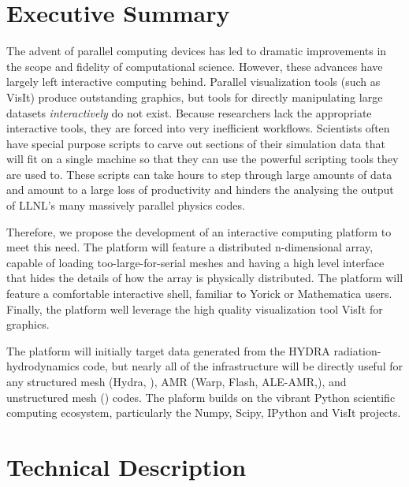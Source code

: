 \documentclass[a4paper]{article}
\begin{document}

\section*{Executive Summary }

The advent of parallel computing devices has led to dramatic improvements in the scope and fidelity of computational science.  However, these advances have largely left interactive computing behind.  Parallel visualization tools (such as VisIt) produce outstanding graphics, but tools for directly manipulating large datasets \emph{interactively} do not exist.  Because researchers lack the appropriate interactive tools, they are forced into very inefficient workflows.  Scientists often have special purpose scripts to carve out sections of their simulation data that will fit on a single machine so that they can use the powerful scripting tools they are used to.  These scripts can take hours to step through large amounts of data and amount to a large loss of productivity and hinders the analysing the output of LLNL's many massively parallel physics codes.

Therefore, we propose the development of an interactive computing platform to meet this need.  The platform will feature a distributed n-dimensional array, capable of loading too-large-for-serial meshes and having a high level interface that hides the details of how the array is physically distributed.  The platform will feature a comfortable interactive shell, familiar to Yorick or Mathematica users.  Finally, the platform well leverage the high quality visualization tool VisIt for graphics.

The platform will initially target data generated from the HYDRA\cite{Marinak2001} radiation-hydrodynamics code, but nearly all of the infrastructure will be directly useful for any structured mesh (Hydra, ), AMR (Warp\cite{Grote2005}, Flash\cite{flash}, ALE-AMR\cite{Koniges2010},), and unstructured mesh () codes.  The plaform builds on the vibrant Python scientific computing ecosystem, particularly the Numpy\cite{Oliphant2006}, Scipy\cite{numpyscipy}, IPython\cite{ipython} and VisIt\cite{VisIt} projects.


\section*{Technical Description}
\end{document}
